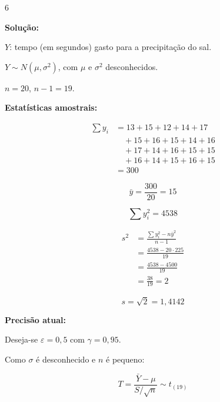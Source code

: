 \documentclass[8pt, a4paper, landscape]{extarticle}
\begin{document}
\begin{multicols}{6}
\vspace{0.3cm}

\textbf{Solução:}

$Y$: tempo (em segundos) gasto para a precipitação do sal.

$Y \sim N(\mu, \sigma^2)$, com $\mu$ e $\sigma^2$ desconhecidos.

$n = 20$, \quad $n - 1 = 19$.

\vspace{0.2cm}

\textbf{Estatísticas amostrais:}

\begin{equation*}
\begin{split}
\sum y_i &= 13+15+12+14+17 \\
&\quad +15+16+15+14+16 \\
&\quad +17+14+16+15+15 \\
&\quad +16+14+15+16+15 \\
&= 300
\end{split}
\end{equation*}

\begin{equation*}
\bar{y} = \frac{300}{20} = 15
\end{equation*}

\begin{equation*}
\sum y_i^2 = 4538
\end{equation*}

\begin{equation*}
\begin{split}
s^2 &= \frac{\sum y_i^2 - n\bar{y}^2}{n-1} \\
&= \frac{4538 - 20 \cdot 225}{19} \\
&= \frac{4538 - 4500}{19} \\
&= \frac{38}{19} = 2
\end{split}
\end{equation*}

\begin{equation*}
s = \sqrt{2} = 1,4142
\end{equation*}

\vspace{0.2cm}

\textbf{Precisão atual:}

Deseja-se $\varepsilon = 0,5$ com $\gamma = 0,95$.

Como $\sigma$ é desconhecido e $n$ é pequeno:

\begin{equation*}
T = \frac{\bar{Y} - \mu}{S/\sqrt{n}} \sim t_{(19)}
\end{equation*}


\end{multicols}
\end{document}
